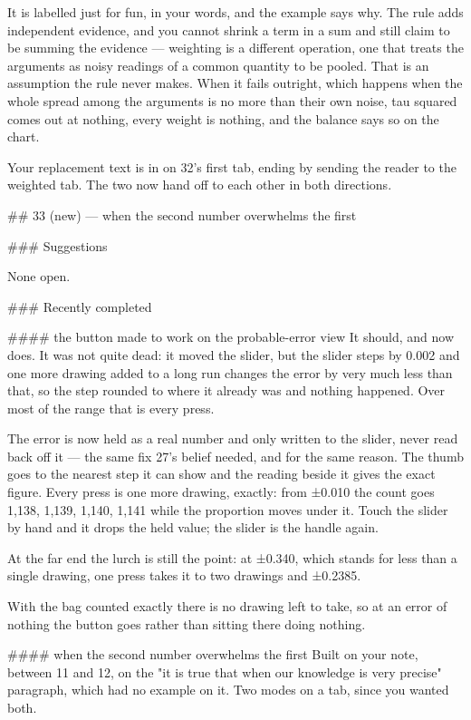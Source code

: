 It is labelled just for fun, in your words, and the example says why. The rule adds
independent evidence, and you cannot shrink a term in a sum and still claim to
be summing the evidence — weighting is a different operation, one that treats
the arguments as noisy readings of a common quantity to be pooled. That is an
assumption the rule never makes. When it fails outright, which happens when the
whole spread among the arguments is no more than their own noise, tau squared
comes out at nothing, every weight is nothing, and the balance says so on the
chart.

Your replacement text is in on 32's first tab, ending by sending the reader to
the weighted tab. The two now hand off to each other in both directions.


## 33 (new) — when the second number overwhelms the first

### Suggestions

None open.

### Recently completed

#### the button made to work on the probable-error view
It should, and now does. It was not quite dead: it moved the slider, but the
slider steps by 0.002 and one more drawing added to a long run changes the error
by very much less than that, so the step rounded to where it already was and
nothing happened. Over most of the range that is every press.

The error is now held as a real number and only written to the slider, never
read back off it — the same fix 27's belief needed, and for the same reason. The
thumb goes to the nearest step it can show and the reading beside it gives the
exact figure. Every press is one more drawing, exactly: from ±0.010 the count
goes 1,138, 1,139, 1,140, 1,141 while the proportion moves under it. Touch the
slider by hand and it drops the held value; the slider is the handle again.

At the far end the lurch is still the point: at ±0.340, which stands for less
than a single drawing, one press takes it to two drawings and ±0.2385.

With the bag counted exactly there is no drawing left to take, so at an error of
nothing the button goes rather than sitting there doing nothing.

#### when the second number overwhelms the first
Built on your note, between 11 and 12, on the "it is true that when our
knowledge is very precise" paragraph, which had no example on it. Two modes on a
tab, since you wanted both.

